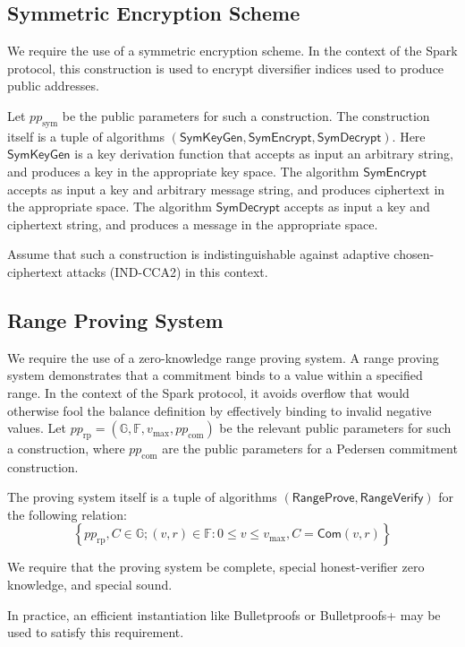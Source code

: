 \documentclass{llncs}
\newcommand{\G}{\mathbb{G}}
\newcommand{\F}{\mathbb{F}}
\newcommand{\func}[1]{\mathsf{#1}}
\newcommand{\com}{\func{Com}}
\begin{document}
\subsection{Symmetric Encryption Scheme}

We require the use of a symmetric encryption scheme.
In the context of the Spark protocol, this construction is used to encrypt diversifier indices used to produce public addresses.

Let $pp_{\text{sym}}$ be the public parameters for such a construction.
The construction itself is a tuple of algorithms $(\func{SymKeyGen},\func{SymEncrypt},\func{SymDecrypt})$.
Here $\func{SymKeyGen}$ is a key derivation function that accepts as input an arbitrary string, and produces a key in the appropriate key space.
The algorithm $\func{SymEncrypt}$ accepts as input a key and arbitrary message string, and produces ciphertext in the appropriate space.
The algorithm $\func{SymDecrypt}$ accepts as input a key and ciphertext string, and produces a message in the appropriate space.

Assume that such a construction is indistinguishable against adaptive chosen-ciphertext attacks (IND-CCA2) in this context.


\subsection{Range Proving System}

We require the use of a zero-knowledge range proving system.
A range proving system demonstrates that a commitment binds to a value within a specified range.
In the context of the Spark protocol, it avoids overflow that would otherwise fool the balance definition by effectively binding to invalid negative values.
Let $pp_{\text{rp}} = (\G, \F, v_{\text{max}}, pp_{\text{com}})$ be the relevant public parameters for such a construction, where $pp_{\text{com}}$ are the public parameters for a Pedersen commitment construction.

The proving system itself is a tuple of algorithms $(\func{RangeProve},\func{RangeVerify})$ for the following relation:
$$\left\{ pp_{\text{rp}}, C \in \G ; (v, r) \in \F : 0 \leq v \leq v_{\text{max}}, C = \com(v,r) \right\}$$

We require that the proving system be complete, special honest-verifier zero knowledge, and special sound.

In practice, an efficient instantiation like Bulletproofs \cite{bp} or Bulletproofs+ \cite{bp_plus} may be used to satisfy this requirement.
\end{document}
